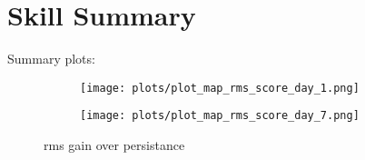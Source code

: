 \documentclass[jmse,article,submit,moreauthors,pdftex,10pt,a4paper]{mdpi}
\begin{document}

\section{Skill Summary}


Summary plots:


\begin{figure}[H]
\centering
    \begin{subfigure}[b]{0.45\textwidth}
        \texttt{[image: plots/plot\_map\_rms\_score\_day\_1.png]}
    \end{subfigure}
    \begin{subfigure}[b]{0.45\textwidth}
        \texttt{[image: plots/plot\_map\_rms\_score\_day\_7.png]}
    \end{subfigure}
    \label{fig:rmsgain_b}
    \caption{ rms gain over persistance}
\end{figure}   
\end{document}
